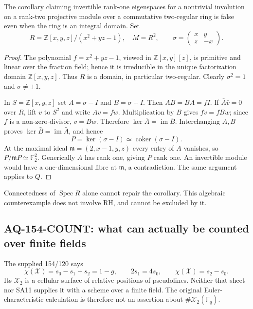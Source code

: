 \documentclass[11pt,a4paper]{article}
\theoremstyle{definition}\newtheorem{definition}[theorem]{Definition}
\theoremstyle{remark}\newtheorem{remark}[theorem]{Remark}
\begin{document}
The corollary claiming invertible rank-one eigenspaces
for a nontrivial involution on a rank-two projective
module over a commutative two-regular ring is false
even when the ring is an integral domain. Set
\[
 R=\mathbb Z[x,y,z]/(x^2+yz-1),\quad M=R^2,\qquad
 \sigma=\begin{pmatrix}x&y\\z&-x\end{pmatrix}.                   \tag{AQ.9}
\]
\begin{proof}
The polynomial $f=x^2+yz-1$, viewed in
$\mathbb Z[x,y][z]$, is primitive and linear over
the fraction field; hence it is irreducible in
the unique factorization domain $\mathbb Z[x,y,z]$.
Thus $R$ is a domain, in particular two-regular.
Clearly $\sigma^2=1$ and $\sigma\ne\pm1$.

In $S=\mathbb Z[x,y,z]$ set $A=\sigma-I$ and
$B=\sigma+I$. Then $AB=BA=fI$.
If $\bar A\bar v=0$ over $R$, lift $v$ to $S^2$
and write $Av=fw$. Multiplication by $B$ gives
$fv=fBw$; since $f$ is a non-zero-divisor,
$v=Bw$. Therefore $\ker\bar A=\operatorname{im}\bar B$.
Interchanging $A,B$ proves
$\ker\bar B=\operatorname{im}\bar A$, and hence
\[
 P=\ker(\sigma-I)\simeq\operatorname{coker}(\sigma-I).
\]
At the maximal ideal
$\mathfrak m=(2,x-1,y,z)$ every entry of $A$
vanishes, so
$P/\mathfrak mP\simeq\mathbb F_2^2$.
Generically $A$ has rank one, giving $P$ rank one.
An invertible module would have a one-dimensional
fibre at $\mathfrak m$, a contradiction.
The same argument applies to $Q$.
\end{proof}
Connectedness of $\operatorname{Spec}R$ alone cannot
repair the corollary. This algebraic counterexample
does not involve RH, and cannot be excluded by it.

\subsection{AQ-154-COUNT: what can actually be counted over finite fields}
The supplied 154/120 says
\[
 \chi(\mathcal X)=s_0-s_1+s_2=1-g,\qquad
 2s_1=4s_0,\qquad \chi(\mathcal X)=s_2-s_0.
\]
Its $\mathcal X_2$ is a cellular surface of relative
positions of pseudolines. Neither that sheet nor SA11
supplies it with a scheme over a finite field.
The original Euler-characteristic calculation is
therefore not an assertion about
$\#\mathcal X_2(\mathbb F_q)$.
\end{document}
